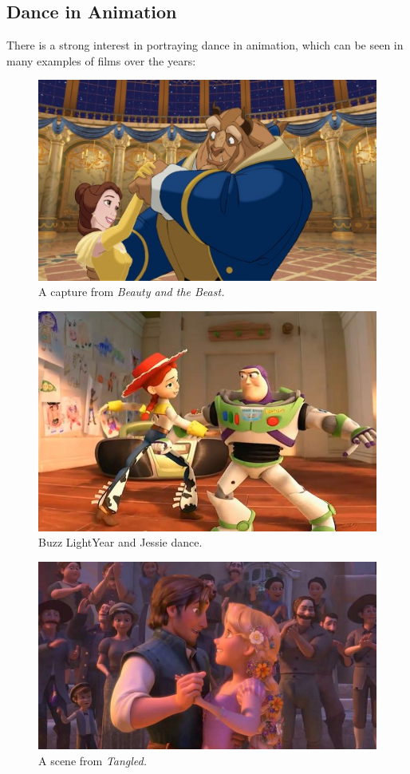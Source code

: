 \subsection{Dance in Animation}
There is a strong interest in portraying dance in animation, which can be seen in many examples of films over the years:
\begin{figure}[!h]
\centering
\includegraphics[scale=0.5]{img/belleetlabete}
\caption{A capture from \textit{Beauty and the Beast.}}
\end{figure}

\begin{figure}[!h]
\centering
\includegraphics[scale=0.5]{img/buzz-and-jessie}
\caption{Buzz LightYear and Jessie dance.}
\end{figure}

\begin{figure}[!h]
\centering
\includegraphics[scale=0.5]{img/tangled}
\caption{A scene from \textit{Tangled.}}
\end{figure}

